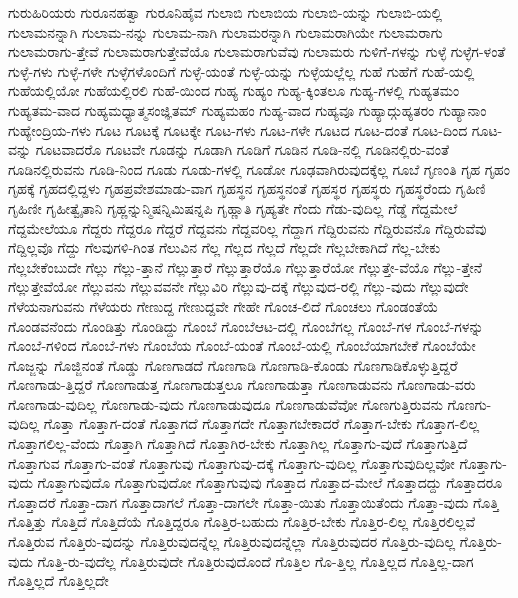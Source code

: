 {ಗುರುಹಿರಿಯರು
ಗುರೂನಹತ್ವಾ
ಗುರೂನಿಹೈವ
ಗುಲಾಬಿ
ಗುಲಾಬಿಯ
ಗುಲಾಬಿ-ಯನ್ನು
ಗುಲಾಬಿ-ಯಲ್ಲಿ
ಗುಲಾಮನನ್ನಾಗಿ
ಗುಲಾಮ-ನನ್ನು
ಗುಲಾಮ-ನಾಗಿ
ಗುಲಾಮರನ್ನಾಗಿ
ಗುಲಾಮರಾಗಿಯೇ
ಗುಲಾಮರಾಗು
ಗುಲಾಮರಾಗು-ತ್ತೇವೆ
ಗುಲಾಮರಾಗುತ್ತೇವೆಯೊ
ಗುಲಾಮರಾಗುವೆವು
ಗುಲಾಮರು
ಗುಳಿಗೆ-ಗಳನ್ನು
ಗುಳ್ಳೆ
ಗುಳ್ಳೆಗ-ಳಂತೆ
ಗುಳ್ಳೆ-ಗಳು
ಗುಳ್ಳೆ-ಗಳೇ
ಗುಳ್ಳೆಗಳೊಂದಿಗೆ
ಗುಳ್ಳೆ-ಯಂತೆ
ಗುಳ್ಳೆ-ಯನ್ನು
ಗುಳ್ಳೆಯಲ್ಲೆಲ್ಲ
ಗುಹೆ
ಗುಹೆಗೆ
ಗುಹೆ-ಯಲ್ಲಿ
ಗುಹೆಯಲ್ಲಿಯೋ
ಗುಹೆಯಲ್ಲಿರಲಿ
ಗುಹೆ-ಯಿಂದ
ಗುಹ್ಯ
ಗುಹ್ಯಂ
ಗುಹ್ಯ-ಕ್ಕಿಂತಲೂ
ಗುಹ್ಯ-ಗಳಲ್ಲಿ
ಗುಹ್ಯತಮಂ
ಗುಹ್ಯತಮ-ವಾದ
ಗುಹ್ಯಮಧ್ಯಾತ್ಮಸಂಜ್ಞಿತಮ್
ಗುಹ್ಯಮಹಂ
ಗುಹ್ಯ-ವಾದ
ಗುಹ್ಯವೂ
ಗುಹ್ಯಾದ್ಗುಹ್ಯತರಂ
ಗುಹ್ಯಾನಾಂ
ಗುಹ್ಯೇಂದ್ರಿಯ-ಗಳು
ಗೂಟ
ಗೂಟಕ್ಕೆ
ಗೂಟಕ್ಕೇ
ಗೂಟ-ಗಳು
ಗೂಟ-ಗಳೇ
ಗೂಟದ
ಗೂಟ-ದಂತೆ
ಗೂಟ-ದಿಂದ
ಗೂಟ-ವನ್ನು
ಗೂಟವಾದರೊ
ಗೂಟವೇ
ಗೂಡನ್ನು
ಗೂಡಾಗಿ
ಗೂಡಿಗೆ
ಗೂಡಿನ
ಗೂಡಿ-ನಲ್ಲಿ
ಗೂಡಿನಲ್ಲಿರು-ವಂತೆ
ಗೂಡಿನಲ್ಲಿರುವನು
ಗೂಡಿ-ನಿಂದ
ಗೂಡು
ಗೂಡು-ಗಳಲ್ಲಿ
ಗೂಡೋ
ಗೂಢವಾಗಿರುವುದಕ್ಕೆಲ್ಲ
ಗೂಬೆ
ಗೃಣಂತಿ
ಗೃಹ
ಗೃಹಂ
ಗೃಹಕ್ಕೆ
ಗೃಹದಲ್ಲಿದ್ದಳು
ಗೃಹಪ್ರವೇಶಮಾಡು-ವಾಗ
ಗೃಹಸ್ಥನ
ಗೃಹಸ್ಥನಂತೆ
ಗೃಹಸ್ಥರ
ಗೃಹಸ್ಥರು
ಗೃಹಸ್ಥರೆಂದು
ಗೃಹಿಣಿ
ಗೃಹಿಣೀ
ಗೃಹೀತ್ವೈತಾನಿ
ಗೃಹ್ಣನ್ನುನ್ಮಿಷನ್ನಿಮಿಷನ್ನಪಿ
ಗೃಹ್ಣಾತಿ
ಗೃಹ್ಯತೇ
ಗೆಂದು
ಗೆಡು-ವುದಿಲ್ಲ
ಗೆಡ್ಡೆ
ಗೆದ್ದಮೇಲೆ
ಗೆದ್ದಮೇಲೆಯೂ
ಗೆದ್ದರು
ಗೆದ್ದರೂ
ಗೆದ್ದರೆ
ಗೆದ್ದವನು
ಗೆದ್ದವರಿಲ್ಲ
ಗೆದ್ದಾಗ
ಗೆದ್ದಿರುವನು
ಗೆದ್ದಿರುವನೊ
ಗೆದ್ದಿರುವೆವು
ಗೆದ್ದಿಲ್ಲವೊ
ಗೆದ್ದು
ಗೆಲವುಗಳಿ-ಗಿಂತ
ಗೆಲುವಿನ
ಗೆಲ್ಲ
ಗೆಲ್ಲದ
ಗೆಲ್ಲದೆ
ಗೆಲ್ಲದೇ
ಗೆಲ್ಲಬೇಕಾಗಿದೆ
ಗೆಲ್ಲ-ಬೇಕು
ಗೆಲ್ಲಬೇಕೆಂಬುದೇ
ಗೆಲ್ಲು
ಗೆಲ್ಲು-ತ್ತಾನೆ
ಗೆಲ್ಲುತ್ತಾರೆ
ಗೆಲ್ಲುತ್ತಾರೆಯೊ
ಗೆಲ್ಲುತ್ತಾರೆಯೋ
ಗೆಲ್ಲುತ್ತೇ-ವೆಯೊ
ಗೆಲ್ಲು-ತ್ತೇನೆ
ಗೆಲ್ಲುತ್ತೇವೆಯೋ
ಗೆಲ್ಲುವನು
ಗೆಲ್ಲುವವನೇ
ಗೆಲ್ಲುವಿರಿ
ಗೆಲ್ಲುವು-ದಕ್ಕೆ
ಗೆಲ್ಲುವುದ-ರಲ್ಲಿ
ಗೆಲ್ಲು-ವುದು
ಗೆಲ್ಲುವುದೇ
ಗೆಳೆಯನಾಗುವನು
ಗೆಳೆಯರು
ಗೇಣುದ್ದ
ಗೇಣುದ್ದವೇ
ಗೇಹೇ
ಗೊಂಚ-ಲಿದೆ
ಗೊಂಚಲು
ಗೊಂಡಂತೆಯೆ
ಗೊಂಡವನೆಂದು
ಗೊಂಡಿತ್ತು
ಗೊಂಡಿದ್ದು
ಗೊಂಬೆ
ಗೊಂಬೆಆಟ-ದಲ್ಲಿ
ಗೊಂಬೆಗಲ್ಲ
ಗೊಂಬೆ-ಗಳ
ಗೊಂಬೆ-ಗಳನ್ನು
ಗೊಂಬೆ-ಗಳಿಂದ
ಗೊಂಬೆ-ಗಳು
ಗೊಂಬೆಯ
ಗೊಂಬೆ-ಯಂತೆ
ಗೊಂಬೆ-ಯಲ್ಲಿ
ಗೊಂಬೆಯಾಗಬೇಕೆ
ಗೊಂಬೆಯೇ
ಗೊಜ್ಜನ್ನು
ಗೊಜ್ಜಿನಂತೆ
ಗೊಡ್ಡು
ಗೊಣಗಾಡದೆ
ಗೊಣಗಾಡಿ
ಗೊಣಗಾಡಿ-ಕೊಂಡು
ಗೊಣಗಾಡಿಕೊಳ್ಳುತ್ತಿದ್ದರೆ
ಗೊಣಗಾಡು-ತ್ತಿದ್ದರೆ
ಗೊಣಗಾಡುತ್ತ
ಗೊಣಗಾಡುತ್ತಲೂ
ಗೊಣಗಾಡುತ್ತಾ
ಗೊಣಗಾಡುವನು
ಗೊಣಗಾಡು-ವರು
ಗೊಣಗಾಡು-ವುದಿಲ್ಲ
ಗೊಣಗಾಡು-ವುದು
ಗೊಣಗಾಡುವುದೂ
ಗೊಣಗಾಡುವೆವೋ
ಗೊಣಗುತ್ತಿರುವನು
ಗೊಣಗು-ವುದಿಲ್ಲ
ಗೊತ್ತಾ
ಗೊತ್ತಾಗ-ದಂತೆ
ಗೊತ್ತಾಗದೆ
ಗೊತ್ತಾಗದೇ
ಗೊತ್ತಾಗಬೇಕಾದರೆ
ಗೊತ್ತಾಗ-ಬೇಕು
ಗೊತ್ತಾಗ-ಲಿಲ್ಲ
ಗೊತ್ತಾಗಲಿಲ್ಲ-ವೆಂದು
ಗೊತ್ತಾಗಿ
ಗೊತ್ತಾಗಿದೆ
ಗೊತ್ತಾಗಿರ-ಬೇಕು
ಗೊತ್ತಾಗಿಲ್ಲ
ಗೊತ್ತಾಗು-ವುದೆ
ಗೊತ್ತಾಗುತ್ತಿದೆ
ಗೊತ್ತಾಗುವ
ಗೊತ್ತಾಗು-ವಂತೆ
ಗೊತ್ತಾಗುವು
ಗೊತ್ತಾಗುವು-ದಕ್ಕೆ
ಗೊತ್ತಾಗು-ವುದಿಲ್ಲ
ಗೊತ್ತಾಗುವುದಿಲ್ಲವೋ
ಗೊತ್ತಾಗು-ವುದು
ಗೊತ್ತಾಗುವುದೊ
ಗೊತ್ತಾಗುವುದೋ
ಗೊತ್ತಾಗುವುವು
ಗೊತ್ತಾದ
ಗೊತ್ತಾದ-ಮೇಲೆ
ಗೊತ್ತಾದದ್ದು
ಗೊತ್ತಾದರೂ
ಗೊತ್ತಾದರೆ
ಗೊತ್ತಾ-ದಾಗ
ಗೊತ್ತಾದಾಗಲೆ
ಗೊತ್ತಾ-ದಾಗಲೇ
ಗೊತ್ತಾ-ಯಿತು
ಗೊತ್ತಾಯಿತೆಂದು
ಗೊತ್ತಾ-ವುದು
ಗೊತ್ತಿ
ಗೊತ್ತಿತ್ತು
ಗೊತ್ತಿದೆ
ಗೊತ್ತಿದೆಯೆ
ಗೊತ್ತಿದ್ದರೂ
ಗೊತ್ತಿರ-ಬಹುದು
ಗೊತ್ತಿರ-ಬೇಕು
ಗೊತ್ತಿರ-ಲಿಲ್ಲ
ಗೊತ್ತಿರಲಿಲ್ಲವೆ
ಗೊತ್ತಿರುವ
ಗೊತ್ತಿರು-ವುದನ್ನು
ಗೊತ್ತಿರುವುದನ್ನೆಲ್ಲ
ಗೊತ್ತಿರುವುದನ್ನೆಲ್ಲಾ
ಗೊತ್ತಿರುವುದರ
ಗೊತ್ತಿರು-ವುದಿಲ್ಲ
ಗೊತ್ತಿರು-ವುದು
ಗೊತ್ತಿ-ರು-ವುದೆಲ್ಲ
ಗೊತ್ತಿರುವುದೇ
ಗೊತ್ತಿರುವುದೊಂದೆ
ಗೊತ್ತಿಲ
ಗೊ-ತ್ತಿಲ್ಲ
ಗೊತ್ತಿಲ್ಲದ
ಗೊತ್ತಿಲ್ಲ-ದಾಗ
ಗೊತ್ತಿಲ್ಲದೆ
ಗೊತ್ತಿಲ್ಲದೇ
}
